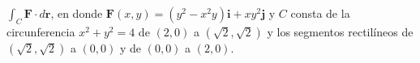 \item $\int_C \mathbf{F} \cdot d\mathbf{r}$, en donde $\mathbf{F}(x, y) = (y^2 - x^2y)\mathbf{i} + xy^2\mathbf{j}$ y $C$ consta de la circunferencia $x^2 + y^2 = 4$ de $(2, 0)$ a $(\sqrt{2}, \sqrt{2})$ y los segmentos rectilíneos de $(\sqrt{2}, \sqrt{2})$ a $(0, 0)$ y de $(0, 0)$ a $(2, 0)$.

